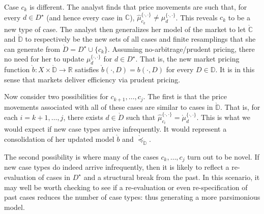 \documentclass[ecta,nameyear,draft]{econsocart}
\newcommand{\R}{\mathbb R}
\newcommand{\mbbd}{{\mathds D}}
\newcommand{\mbbc}{{\mathds C}}
\newcommand{\past}{{D^\star}}
\theoremstyle{plain}
\theoremstyle{remark}
\begin{document}
Case $c_{k}$ is different. The analyst finds that price movements are such
that, for every $d \in \past$ (and hence every case in $\mbbc$),
$\hat{\mu}^{\{\cdot,\cdot\}}_{c_{k}} \neq \mu^{\{\cdot,\cdot\}}_{d}$.  This
reveals $c_{k}$ to be a new type of case.  The analyst then {generalizes} her
model of the market to let $\grave{\mbbc}$ and $\grave{\mbbd}$ to respectively
be the new sets of all cases and finite resamplings that she can generate from
$\grave{D} = \past \cup \{c_{k}\}$. Assuming no-arbitrage/prudent pricing,
there no need for her to update $\mu^{\{\cdot,\cdot\}}_{d}$ for $d \in \past$.
That is, the new market pricing function $\grave{b}: X \times \grave{\mbbd}
\rightarrow \R$ satisfies $\grave{b}(\cdot, D) = b(\cdot, D)$ for every $D \in
\mbbd$. It is in this sense that markets deliver efficiency via prudent
pricing.

Now consider two possibilities for $c_{k+1},\dots,c_{j}$. The first is that the
price movements associated with all of these cases are similar to cases in
$\grave{\mbbd}$. That is, for each $i=k+1,\dots,j$, there exists $d\in
\grave{D}$ such that $\hat{\mu}^{\{\cdot,\cdot\}}_{c_{i}} =
\grave{\mu}^{\{\cdot,\cdot\}}_{d}$. This is what we would expect if new case
types arrive infrequently. It would represent a consolidation of her updated
model $\grave{b}$ and $\grave{\preceq}_{\grave{\mbbd}}$.

The second possibility is where many of the cases $c_{k},\dots,c_{j}$ turn out
to be novel.  If new case types do indeed arrive infrequently, then it is
likely to reflect a re-evaluation of cases in $\past$ and a structural break
from the past. In this scenario, it may well be worth checking to see if a
re-evaluation or even re-specification of past cases reduces the number of case
types: thus generating a more parsimonious model.
\end{document}
